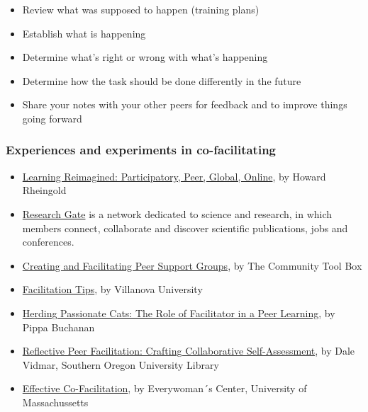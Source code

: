 \begin{itemize}
\item
  Review what was supposed to happen (training plans)
\item
  Establish what is happening
\item
  Determine what's right or wrong with what's happening
\item
  Determine how the task should be done differently in the future
\item
  Share your notes with your other peers for feedback and to improve
  things going forward
\end{itemize}
\subsubsection{Experiences and experiments in co-facilitating}

\begin{itemize}
\item
  \href{http://dmlcentral.net/blog/howard-rheingold/learning-reimagined-participatory-peer-global-online}{Learning
  Reimagined: Participatory, Peer, Global, Online}, by Howard Rheingold
\item
  \href{http://www.researchgate.net/}{Research Gate} is a network
  dedicated to science and research, in which members connect,
  collaborate and discover scientific publications, jobs and
  conferences.
\item
  \href{http://ctb.ku.edu/en/tablecontents/section\_1180.aspx}{Creating
  and Facilitating Peer Support Groups}, by The Community Tool Box
\item
  \href{http://www1.villanova.edu/content/villanova/artsci/vcle/resources/toolkit/\_jcr\_content/pagecontent/download\_8/file.res/FacilitationTips.doc}{Facilitation
  Tips}, by Villanova University
\item
  \href{http://pippabuchanan.com/2011/09/04/herding-passionate-cats-the-role-of-facilitator-in-a-peer-learning-process/}{Herding
  Passionate Cats: The Role of Facilitator in a Peer Learning}, by Pippa
  Buchanan
\item
  \href{http://webpages.sou.edu/~vidmar/SOARS2008/vidmar.ppt}{Reflective
  Peer Facilitation: Crafting Collaborative Self-Assessment}, by Dale
  Vidmar, Southern Oregon University Library
\item
  \href{http://www.umass.edu/ewc/ea/Facilitation\%20Skills/important\%20tips.doc}{Effective
  Co-Facilitation}, by Everywoman´s Center, University of Massachussetts
\end{itemize}

